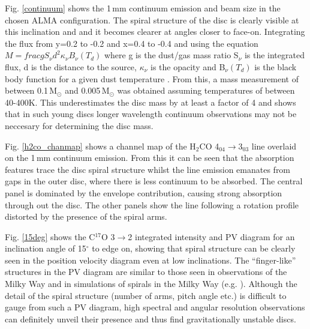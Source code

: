 \documentclass[useAMS,usenatbib]{mn2e}
\begin{document}
Fig. \ref{continuum} shows the 1\,mm continuum emission and beam size in the chosen ALMA configuration. The spiral structure of the disc is clearly visible at this inclination and and it becomes clearer at angles closer to face-on. Integrating the flux from y=0.2 to -0.2 and x=0.4 to -0.4 and using the equation $M=frac{g S_\nu d^2}{\kappa_\nu B_\nu(T_d)}$ where g is the dust/gas mass ratio S$_\nu$ is the integrated flux, d is the distance to the source, $\kappa_\nu$ is the opacity and B$_\nu(T_d)$ is the black body function for a given dust temperature \citep{Beltran2006}. From this, a mass measurement of between 0.1$\,$M$_\odot$ and 0.005$\,$M$_\odot$ was obtained assuming temperatures of between 40-400K. This underestimates the disc mass by at least a factor of 4 and shows that in such young discs longer wavelength continuum observations may not be neccesary for determining the disc mass.\smallskip

Fig. \ref{h2co_chanmap} shows a channel map of the H$_2$CO 4$_{04}\rightarrow$3$_{03}$ line overlaid on the 1$\,$mm continuum emission. From this it can be seen that the absorption features trace the disc spiral structure whilst the line emission emanates from gaps in the outer disc, where there is less continuum to be absorbed. The central panel is dominated by the envelope contribution, causing strong absorption through out the disc. The other panels show the line following a rotation profile distorted by the presence of the spiral arms. \smallskip

Fig. \ref{15deg} shows the C$^{17}$O 3$\rightarrow$2 integrated intensity and PV diagram for an inclination angle of 15$^\circ$ to edge on, showing that spiral structure can be clearly seen in the position velocity diagram even at low inclinations. The ``finger-like'' structures in the PV diagram are similar to those seen in observations of the Milky Way and in simulations of spirals in the Milky Way (e.g. \citealt{Bissantz2003}). Although the detail of the spiral structure (number of arms, pitch angle etc.) is difficult to gauge from such a PV diagram, high spectral and angular resolution observations can definitely unveil their presence and thus find gravitationally unstable discs. \smallskip
\end{document}
